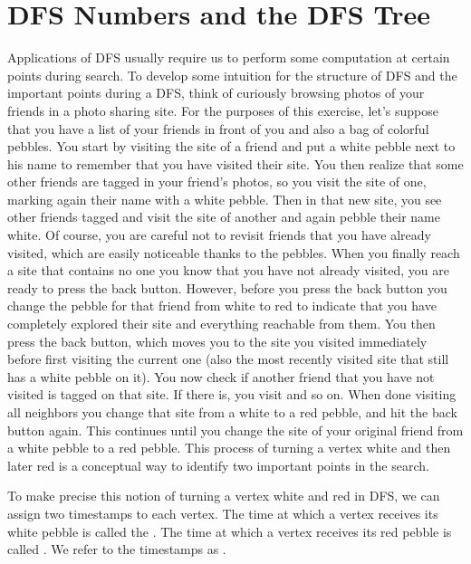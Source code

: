\section{DFS Numbers and the DFS Tree}
Applications of DFS usually require us to perform some computation at
certain points during search.  
%
To develop some intuition for the structure of DFS and the important
points during a DFS, think of curiously browsing photos of your
friends in a photo sharing site.
%
For the purposes of this exercise, let's suppose that you have a list
of your friends in front of you and also a bag of colorful pebbles.
%
You start by visiting the site of a friend and put a white pebble next
to his name to remember that you have visited their site.
%
You then realize that some other friends are tagged in your friend's
photos, so you visit the site of one, marking again their name with a
white pebble.
%
Then in that new site, you see other friends tagged and visit the site
of another and again pebble their name white.  
%
Of course, you are careful not to revisit friends that you have
already visited, which are easily noticeable thanks to the pebbles. 
%
When you finally reach a site that contains no one you know that you
have not already visited, you are
ready to press the back button.  
%
However, before you press the back button you change the pebble for
that friend from white to red to indicate that you have completely
explored their site and everything reachable from them.  
%
You then press the back button, which moves you to the site you
visited immediately before first visiting the current one (also the
most recently visited site that still has a white pebble on it). 
%
You now check if another friend that you have not visited is tagged on
that site.  
%
If there is, you visit and so on.
%
When done visiting all neighbors you change that site from a white to
a red pebble, and hit the back button again.  This continues until you
change the site of your original friend from a white pebble to a red
pebble.
%
This process of turning a vertex white and then later red is a
conceptual way to identify two important points in the search. 

To make precise this notion of turning a vertex white and red in DFS,
we can assign two timestamps to each vertex.  The time at which a
vertex receives its white pebble is called the .  The time at which a vertex receives its red
pebble is called .  We
refer to the timestamps as .    

